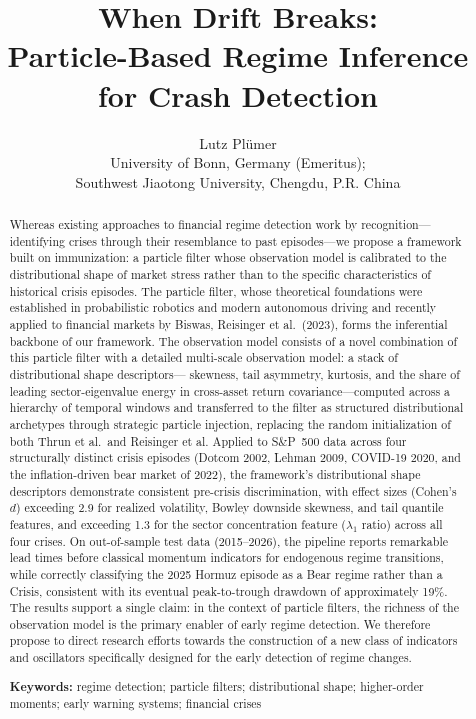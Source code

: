\documentclass[11pt]{article}
\title{When Drift Breaks: \\
       Particle-Based Regime Inference for Crash Detection}
\author{Lutz Pl\"umer\\
  \small University of Bonn, Germany (Emeritus);\\
  \small Southwest Jiaotong University, Chengdu, P.R. China}
\date{}
\begin{document}
\maketitle

\begin{abstract}
Whereas existing approaches to financial regime detection work by
recognition---identifying crises through their resemblance to past
episodes---we propose a framework built on immunization: a particle
filter whose observation model is calibrated to the distributional
shape of market stress rather than to the specific characteristics of
historical crisis episodes. The particle filter, whose theoretical
foundations were established in probabilistic robotics and modern
autonomous driving \citep{Thrun2005} and recently applied to financial
markets by Biswas, Reisinger et al.\ (2023), forms the inferential
backbone of our framework. The observation model consists of a novel
combination of this particle filter with a detailed multi-scale
observation model: a stack of distributional shape descriptors---
skewness, tail asymmetry, kurtosis, and the share of leading
sector-eigenvalue energy in cross-asset return covariance---computed
across a hierarchy of temporal windows and transferred to the filter as
structured distributional archetypes through strategic particle
injection, replacing the random initialization of both Thrun et al.\ and
Reisinger et al. Applied to S\&P~500 data across four structurally
distinct crisis episodes (Dotcom 2002, Lehman 2009, COVID-19 2020, and
the inflation-driven bear market of 2022), the framework's
distributional shape descriptors demonstrate consistent pre-crisis
discrimination, with effect sizes (Cohen's $d$) exceeding 2.9 for
realized volatility, Bowley downside skewness, and tail quantile
features, and exceeding 1.3 for the sector concentration feature
($\lambda_1$ ratio) across all four crises. On out-of-sample test data
(2015--2026), the pipeline reports remarkable lead times before
classical momentum indicators for endogenous regime transitions, while
correctly classifying the 2025 Hormuz episode as a Bear regime rather
than a Crisis, consistent with its eventual peak-to-trough drawdown of
approximately 19\%. The results support a single claim: in the context
of particle filters, the richness of the observation model is the
primary enabler of early regime detection. We therefore propose to
direct research efforts towards the construction of a new class of
indicators and oscillators specifically designed for the early
detection of regime changes.

\medskip
\noindent\textbf{Keywords:} regime detection; particle filters;
distributional shape; higher-order moments; early warning systems;
financial crises
\end{abstract}
\end{document}

